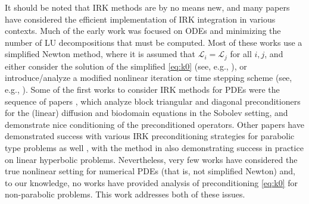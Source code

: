\documentclass[review]{siamart}
\begin{document}
It should be noted that IRK methods are by no means new, and many papers have
considered the efficient implementation of IRK integration in various contexts.
Much of the early work was focused on ODEs and minimizing the number of LU
decompositions that must be computed. Most of these works use a simplified
Newton method, where it is assumed that $\mathcal{L}_i = \mathcal{L}_j$ for all
$i,j$, and either consider the solution of the simplified \eqref{eq:k0} (see,
e.g., \cite{varah79,butcher76,bickart77,houwen97b,jay99}), or introduce/analyze
a modified nonlinear iteration or time stepping scheme (see, e.g.,
\cite{cooper83,pinto95,pinto96,cooper90,hoffmann97,jay00}). Some of the first
works to consider IRK methods for PDEs were the sequence of papers
\cite{mardel07,nissen11,staff06}, which analyze block triangular and diagonal
preconditioners for the (linear) diffusion and biodomain equations in the
Sobolev setting, and demonstrate nice conditioning of the preconditioned
operators. Other papers have demonstrated success with various IRK
preconditioning strategies for parabolic type problems as well
\cite{vanlent05,chen14,exh,8jp,27n}, with the method in \cite{exh} also
demonstrating success in practice on linear hyperbolic problems. Nevertheless,
very few works have considered the true nonlinear setting for numerical PDEs
(that is, not simplified Newton) and, to our knowledge, no works have provided
analysis of preconditioning \eqref{eq:k0} for non-parabolic problems. This work
addresses both of these issues.


\end{document}
